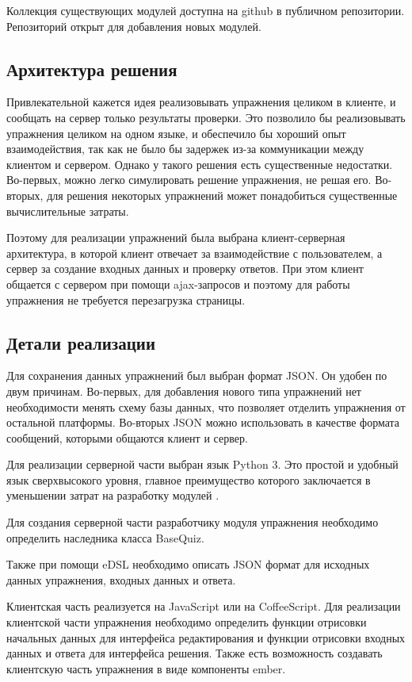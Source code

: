 \documentclass{matmex-diploma-custom}
\begin{document}
Коллекция существующих модулей доступна на github в публичном
репозитории\cite{plugins:repo}. Репозиторий открыт для добавления
новых модулей.

\subsection{Архитектура решения}
Привлекательной кажется идея реализовывать упражнения целиком в
клиенте, и сообщать на сервер только результаты проверки. Это
позволило бы реализовывать упражнения целиком на одном языке, и
обеспечило бы хороший опыт взаимодействия, так как не было бы задержек
из-за коммуникации между клиентом и сервером. Однако у такого решения
есть существенные недостатки. Во-первых, можно легко симулировать
решение упражнения, не решая его. Во-вторых, для решения некоторых
упражнений может понадобиться существенные вычислительные затраты.

Поэтому для реализации упражнений была выбрана клиент-серверная
архитектура, в которой клиент отвечает за взаимодействие с
пользователем, а сервер за создание входных данных и проверку
ответов. При этом клиент общается с сервером при помощи ajax-запросов
и поэтому для работы упражнения не требуется перезагрузка страницы.

\subsection{Детали реализации}
Для сохранения данных упражнений был выбран формат JSON. Он удобен по
двум причинам. Во-первых, для добавления нового типа упражнений нет
необходимости менять схему базы данных, что позволяет отделить
упражнения от остальной платформы. Во-вторых JSON можно использовать в
качестве формата сообщений, которыми общаются клиент и сервер.

Для реализации серверной части выбран язык Python 3. Это простой и
удобный язык сверхвысокого уровня, главное преимущество которого
заключается в уменьшении затрат на разработку модулей \cite{pyprod}.

Для создания серверной части разработчику модуля упражнения необходимо
определить наследника класса BaseQuiz.

Также при помощи eDSL необходимо описать JSON формат для исходных
данных упражнения, входных данных и ответа.

Клиентская часть реализуется на JavaScript или на CoffeeScript. Для
реализации клиентской части упражнения необходимо определить функции
отрисовки начальных данных для интерфейса редактирования и функции
отрисовки входных данных и ответа для интерфейса решения. Также есть
возможность создавать клиентскую часть упражнения в виде компоненты ember.
\end{document}
